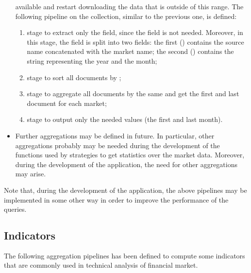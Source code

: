 \begin{itemize}
		available and restart downloading the data that is outside of
		this range. The following pipeline on the 
		collection, similar to the previous one, is defined:
		\begin{enumerate}
			\item {} stage to extract only the
				 field, since the  field
				is not needed. Moreover, in this stage, the
				 field is split into two fields: the
				first () contains the source name
				concatenated with the market name; the second
				() contains the string representing
				the year and the month;
			\item {} stage to sort all documents by
				;
			\item {} stage to aggregate all documents
				by the same  and get the first and
				last document for each market;
			\item {} stage to output only the needed
				values (the first and last month).
		\end{enumerate}
	\item Further aggregations may be defined in future. In particular,
		other aggregations probably may be needed during the development
		of the functions used by strategies to get statistics over the
		market data. Moreover, during the development of the
		application, the need for other aggregations may arise.
\end{itemize}

Note that, during the development of the application, the above pipelines may be
implemented in some other way 
in order to improve the performance of the queries.

\subsection{Indicators}

The following aggregation pipelines has been defined to compute some indicators
that are commonly used in technical analysis of financial market.

